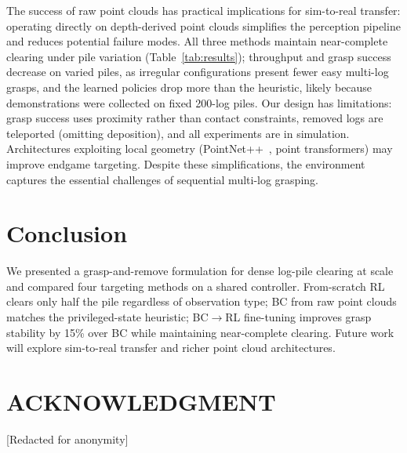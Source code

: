 \documentclass[conference]{IEEEtran}
\begin{document}
The success of raw point clouds has practical implications for sim-to-real transfer: operating directly on depth-derived point clouds simplifies the perception pipeline and reduces potential failure modes.
All three methods maintain near-complete clearing under pile variation (Table~\ref{tab:results}); throughput and grasp success decrease on varied piles, as irregular configurations present fewer easy multi-log grasps, and the learned policies drop more than the heuristic, likely because demonstrations were collected on fixed 200-log piles.
Our design has limitations: grasp success uses proximity rather than contact constraints, removed logs are teleported (omitting deposition), and all experiments are in simulation. Architectures exploiting local geometry (PointNet++~\cite{qi2017pointnetplusplus}, point transformers) may improve endgame targeting. Despite these simplifications, the environment captures the essential challenges of sequential multi-log grasping.

\section{Conclusion}
We presented a grasp-and-remove formulation for dense log-pile clearing at scale and compared four targeting methods on a shared controller.
From-scratch RL clears only half the pile regardless of observation type; BC from raw point clouds matches the privileged-state heuristic; BC$\to$RL fine-tuning improves grasp stability by 15\% over BC while maintaining near-complete clearing.
Future work will explore sim-to-real transfer and richer point cloud architectures.

\section*{ACKNOWLEDGMENT}
[Redacted for anonymity]



\end{document}
